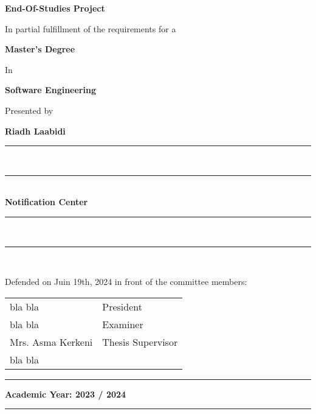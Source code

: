\begin{titlepage}
\begin{center}
        \vspace{2cm}

        \Huge\textbf{End-Of-Studies Project}

        \vspace{1.5cm}

        \normalsize In partial fulfillment of the requirements for a

        \Large\textbf{Master's Degree}

        \normalsize In

        \Large\textbf{Software Engineering}

        \normalsize Presented by

        \large{\textbf{Riadh Laabidi}}
        \vspace{0.5cm}

        \rule[5pt]{0.5\textwidth}{0.5px}\\
        \vspace{-16px}
        \rule[10pt]{0.5\textwidth}{2.5px} \\
        \LARGE{\textbf{Notification Center}} \\
        \rule[5pt]{0.5\textwidth}{0.5px}\\
        \vspace{-15px}
        \rule[10pt]{0.5\textwidth}{2.5px} \\


        \vspace{1cm}

        \small Defended on Juin 19th, 2024 in front of the committee members:

        \renewcommand\arraystretch{1}
        \begin{tabular}{m{} l }
            bla bla  & President               \\
            bla bla   & Examiner                \\
            Mrs. Asma Kerkeni  & Thesis Supervisor       \\
            bla bla
        \end{tabular}
    \end{center}
    \vfill
    \centering
    \rule[0.5px]{30px}{0.5px} \space \footnotesize \textbf{Academic Year: 2023 / 2024} \space \rule[0.5px]{30px}{0.5px}
\end{titlepage}
\cleardoublepage